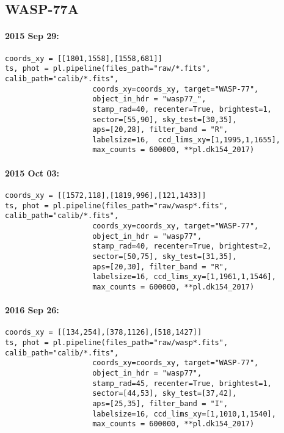 \subsection*{WASP-77A}

\paragraph*{2015 Sep 29:}
\begin{verbatim}
coords_xy = [[1801,1558],[1558,681]]
ts, phot = pl.pipeline(files_path="raw/*.fits", calib_path="calib/*.fits",
                    coords_xy=coords_xy, target="WASP-77",
                    object_in_hdr = "wasp77_",
                    stamp_rad=40, recenter=True, brightest=1,
                    sector=[55,90], sky_test=[30,35],
                    aps=[20,28], filter_band = "R",
                    labelsize=16,  ccd_lims_xy=[1,1995,1,1655],
                    max_counts = 600000, **pl.dk154_2017)
\end{verbatim}
\paragraph*{2015 Oct 03:}
\begin{verbatim}
coords_xy = [[1572,118],[1819,996],[121,1433]]
ts, phot = pl.pipeline(files_path="raw/wasp*.fits", calib_path="calib/*.fits",
                    coords_xy=coords_xy, target="WASP-77",
                    object_in_hdr = "wasp77",
                    stamp_rad=40, recenter=True, brightest=2,
                    sector=[50,75], sky_test=[31,35],
                    aps=[20,30], filter_band = "R",
                    labelsize=16, ccd_lims_xy=[1,1961,1,1546],
                    max_counts = 600000, **pl.dk154_2017)
\end{verbatim}
\paragraph*{2016 Sep 26:}
\begin{verbatim}
coords_xy = [[134,254],[378,1126],[518,1427]]
ts, phot = pl.pipeline(files_path="raw/wasp*.fits", calib_path="calib/*.fits",
                    coords_xy=coords_xy, target="WASP-77",
                    object_in_hdr = "wasp77",
                    stamp_rad=45, recenter=True, brightest=1,
                    sector=[44,53], sky_test=[37,42],
                    aps=[25,35], filter_band = "I",
                    labelsize=16, ccd_lims_xy=[1,1010,1,1540],
                    max_counts = 600000, **pl.dk154_2017)
\end{verbatim}

